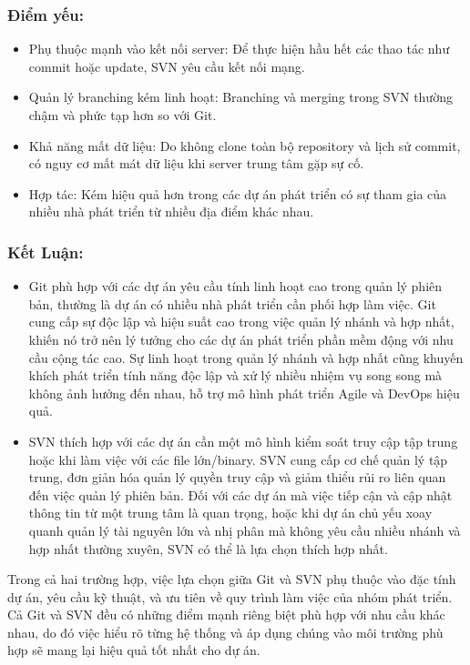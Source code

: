 \subsubsection{Điểm yếu:}
\begin{itemize}
    \item Phụ thuộc mạnh vào kết nối server: Để thực hiện hầu hết các thao tác như commit hoặc update, SVN yêu cầu kết nối mạng.
    \item Quản lý branching kém linh hoạt: Branching và merging trong SVN thường chậm và phức tạp hơn so với Git.
    \item Khả năng mất dữ liệu: Do không clone toàn bộ repository và lịch sử commit, có nguy cơ mất mát dữ liệu khi server trung tâm gặp sự cố.
    \item Hợp tác: Kém hiệu quả hơn trong các dự án phát triển có sự tham gia của nhiều nhà phát triển từ nhiều địa điểm khác nhau.
\end{itemize}

\subsubsection{Kết Luận:}
\begin{itemize}
\item Git phù hợp với các dự án yêu cầu tính linh hoạt cao trong quản lý phiên bản, thường là dự án có nhiều nhà phát triển cần phối hợp làm việc. Git cung cấp sự độc lập và hiệu suất cao trong việc quản lý nhánh và hợp nhất, khiến nó trở nên lý tưởng cho các dự án phát triển phần mềm động với nhu cầu cộng tác cao. Sự linh hoạt trong quản lý nhánh và hợp nhất cũng khuyến khích phát triển tính năng độc lập và xử lý nhiều nhiệm vụ song song mà không ảnh hưởng đến nhau, hỗ trợ mô hình phát triển Agile và DevOps hiệu quả.
\item SVN thích hợp với các dự án cần một mô hình kiểm soát truy cập tập trung hoặc khi làm việc với các file lớn/binary. SVN cung cấp cơ chế quản lý tập trung, đơn giản hóa quản lý quyền truy cập và giảm thiểu rủi ro liên quan đến việc quản lý phiên bản. Đối với các dự án mà việc tiếp cận và cập nhật thông tin từ một trung tâm là quan trọng, hoặc khi dự án chủ yếu xoay quanh quản lý tài nguyên lớn và nhị phân mà không yêu cầu nhiều nhánh và hợp nhất thường xuyên, SVN có thể là lựa chọn thích hợp nhất.
\end{itemize}
Trong cả hai trường hợp, việc lựa chọn giữa Git và SVN phụ thuộc vào đặc tính dự án, yêu cầu kỹ thuật, và ưu tiên về quy trình làm việc của nhóm phát triển. Cả Git và SVN đều có những điểm mạnh riêng biệt phù hợp với nhu cầu khác nhau, do đó việc hiểu rõ từng hệ thống và áp dụng chúng vào môi trường phù hợp sẽ mang lại hiệu quả tốt nhất cho dự án.
